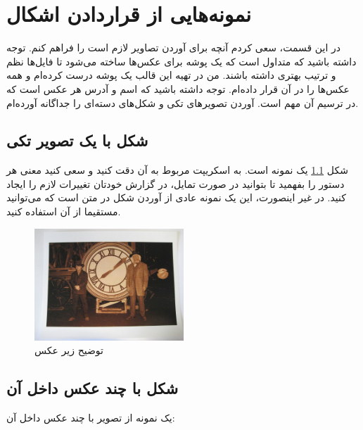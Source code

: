 \chapter{ نمونه‌هایی از قراردادن اشکال}
\label{chap:chap2}

در این قسمت، سعی کردم آنچه برای آوردن تصاویر لازم است را فراهم کنم. 
توجه داشته باشید که متداول است که یک پوشه برای عکس‌ها ساخته می‌شود تا فایل‌ها نظم و ترتیب بهتری داشته باشند. من در تهیه این قالب یک پوشه
درست کرده‌ام و همه عکس‌ها را در آن قرار داده‌ام. توجه داشته باشید که اسم و آدرس هر عکس است که در ترسیم آن مهم است.
آوردن تصویرهای تکی و شکل‌های دسته‌ای را جداگانه آورده‌ام.

\section{
شکل با یک تصویر تکی
}

شکل
\ref{fig:clock_tower_photo}
یک نمونه است. به اسکریپت مربوط به آن دقت کنید و سعی کنید معنی هر دستور را بفهمید تا بتوانید در صورت تمایل، در گزارش خودتان تغییرات لازم را ایجاد کنید. در غیر اینصورت، این یک نمونه عادی از آوردن شکل در متن است که می‌توانید مستقیما از آن استفاده کنید.

\begin{figure}[h]
    \centering
    \includegraphics[width=0.5\textwidth]{figs/doc_and_marty.jpg}
    \caption{
    توضیح زیر عکس
    }
    \label{fig:clock_tower_photo}
\end{figure}


\section{
شکل با چند عکس داخل آن
}


یک نمونه از تصویر با چند عکس داخل آن:


